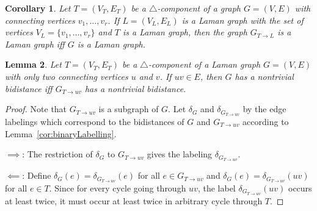 \documentclass[a4paper, 11pt]{article}
\newcommand{\trcomp}{$\triangle$-component}
\newtheorem{lem}{Lemma}[section]
\newtheorem{cor}[lem]{Corollary}
\theoremstyle{definition}
\begin{document}
\begin{cor}
\label{cor:replaceTrcompByLaman}
Let $T=(V_T,E_T)$ be a \trcomp{} of a graph $G=(V,E)$ with connecting vertices $v_1, \dots, v_r$. If $L=(V_L,E_L)$ is a Laman graph with the set of vertices $V_L=\{v_1, \dots, v_r\}$ and $T$ is a Laman graph, then the graph $G_{T\rightarrow L}$ is a Laman graph iff $G$ is a Laman graph.
\end{cor}

\begin{lem}
\label{lem:trcompToEdge}
Let $T=(V_T,E_T)$ be a \trcomp{} of a Laman graph $G=(V,E)$ with only two connecting vertices $u$ and $v$. If $uv\in E$, then $G$ has a nontrivial bidistance iff $G_{T\rightarrow uv}$ has a nontrivial bidistance.
\end{lem}
\begin{proof}
Note that $G_{T\rightarrow uv}$ is a subgraph of $G$. Let $\delta_G$ and $\delta_{G_{T\rightarrow uv}}$ by the edge labelings which correspond to the bidistances of $G$ and $G_{T\rightarrow uv}$ according to Lemma~\ref{cor:binaryLabelling}.

$\implies$: The restriction of $\delta_G$ to  $G_{T\rightarrow uv}$ gives the labeling $\delta_{G_{T\rightarrow uv}}$.

$\impliedby$: Define $\delta_G(e)=\delta_{G_{T\rightarrow uv}}(e)$ for all $e\in G_{T\rightarrow uv}$ and $\delta_G(e)=\delta_{G_{T\rightarrow uv}}(uv)$ for all $e\in T$. Since for every cycle going through $uv$, the label $\delta_{G_{T\rightarrow uv}}(uv)$ occurs at least twice, it must occur at least twice in arbitrary cycle through $T$.
\end{proof}
\end{document}
